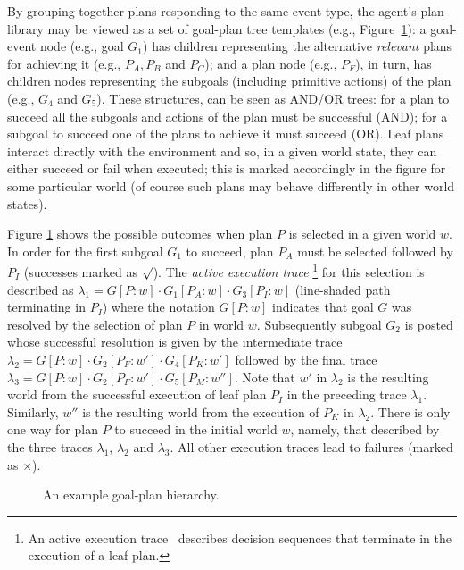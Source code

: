 By grouping together plans responding to the same event type, the agent's plan library may be viewed as a set of goal-plan tree templates (e.g., Figure~\ref{fig:confidence}): a goal-event node (e.g., goal $G_1$) has children representing the alternative \emph{relevant} plans for achieving it (e.g., $P_A,P_B$ and $P_C$); and a plan node (e.g., $P_F$), in turn, has children nodes representing the subgoals (including primitive actions) of the plan (e.g., $G_4$ and $G_5$). These structures, can be seen as AND/OR trees: for a plan to succeed all the subgoals and actions of the plan must be successful (AND); for a subgoal to succeed one of the plans to achieve it must succeed (OR). Leaf plans interact directly with the environment and so, in a given world state, they can either succeed or fail when executed; this is marked accordingly in the figure for some particular world (of course such plans may behave differently in other world states).


Figure \ref{fig:confidence} shows the possible outcomes when plan $P$ is selected in a given world $w$. In order for the first subgoal $G_1$ to succeed, plan $P_A$ must be selected followed by $P_I$ (successes marked as $\surd$). The {\em active execution trace}%
\footnote{An active execution trace~\cite{singh10:learning} describes decision sequences that terminate in the execution of a leaf plan.} 
for this selection is described as $\lambda_1=G[P:w] \cdot G_1[P_A:w] \cdot G_3[P_I:w]$ (line-shaded path terminating in $P_I$) where the notation $G[P:w]$ indicates that goal $G$ was resolved by the selection of plan $P$ in world $w$. Subsequently subgoal $G_2$ is posted whose successful resolution is given by the intermediate trace $\lambda_2=G[P:w] \cdot G_2[P_F:w'] \cdot G_4[P_K:w']$ followed by the final trace $\lambda_3=G[P:w] \cdot G_2[P_F:w'] \cdot G_5[P_M:w'']$. Note that $w'$ in $\lambda_2$ is the resulting world from the successful execution of leaf plan $P_I$ in the preceding trace $\lambda_1$. 
Similarly, $w''$ is the resulting world from the execution of $P_K$ in $\lambda_2$. There is only one way for plan $P$ to succeed in the initial world $w$, namely, that described by the three traces $\lambda_1$, $\lambda_2$ and $\lambda_3$. All other execution traces lead to failures (marked as $\times$).

\begin{figure}[t]
\begin{center}
\resizebox{0.75\columnwidth}{!}{

}
\end{center}
\vskip -0.5cm
\caption{An example goal-plan hierarchy.}
\label{fig:confidence}
\vskip -0.3cm
\end{figure}


